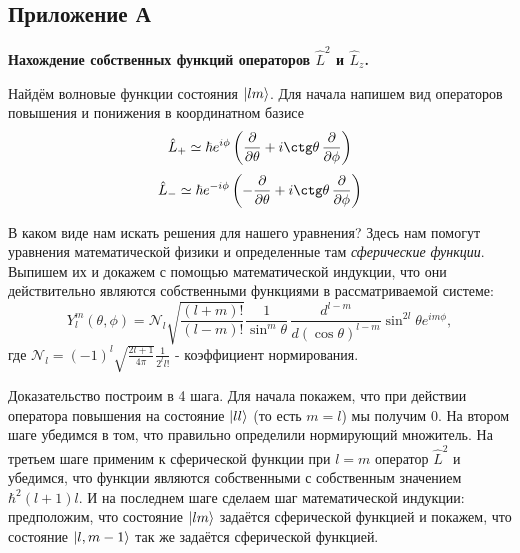 \setcounter{figure}{0}  
\begin{center}
    \section{Приложение А}\label{appendix:A}
    \textbf{\Large{Нахождение собственных функций операторов $\hat{L}^2$ и $\hat{L}_z$}.}
\end{center}
Найдём волновые функции состояния $\ket{lm}$. Для начала напишем вид операторов повышения и понижения в координатном базисе
\[
\hat{L}_+ \simeq \hbar e^{i\phi}\left(\frac{\partial}{\partial \theta} + i \ctg\theta\,\frac{\partial}{\partial \phi} \right)
\]
\[
\hat{L}_- \simeq \hbar e^{-i\phi}\left(-\frac{\partial}{\partial \theta} + i \ctg\theta\,\frac{\partial}{\partial \phi} \right)
\]

В каком виде нам искать решения для нашего уравнения? Здесь нам помогут уравнения математической физики и определенные там \textit{сферические функции}. Выпишем их и докажем с помощью математической индукции, что они действительно являются собственными функциями в рассматриваемой системе:
\[
Y^m_l(\theta, \phi) = \mathcal{N}_l\sqrt{\frac{(l+m)!}{(l-m)!}} \frac{1}{\sin^{m}\theta}\,\frac{d^{l-m}}{d(\cos\theta)^{l-m}}\sin^{2l}\theta e^{im\phi},
\]
где $\mathcal{N}_l = (-1)^l \sqrt{\frac{2l+1}{4\pi}}\frac{1}{2^l l!}$ - коэффициент нормирования.

Доказательство построим в 4 шага. Для начала покажем, что при действии оператора повышения на состояние $\ket{ll}$ (то есть $m = l$) мы получим 0. На втором шаге убедимся в том, что правильно определили нормирующий множитель. На третьем шаге применим к сферической функции при $l=m$ оператор $\hat{L}^2$ и убедимся, что функции являются собственными с собственным значением $\hbar^2(l+1)l$. И на последнем шаге сделаем шаг математической индукции: предположим, что состояние $\ket{lm}$ задаётся сферической функцией и покажем, что состояние $\ket{l, m-1}$ так же задаётся сферической функцией.

